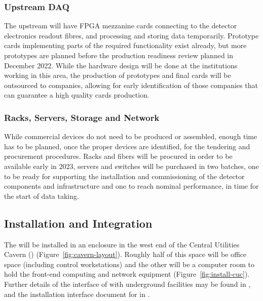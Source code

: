 \subsubsection{Upstream DAQ}
The upstream  will have FPGA mezzanine cards connecting to the detector electronics readout fibres, and processing and storing data temporarily. Prototype cards implementing parts of the required functionality exist already, but more prototypes are planned before the production readiness review planned in December 2022. While the hardware design will be done at the institutions working in this area, the production of prototypes and final cards will be outsourced to companies, allowing for early identification of those companies that can guarantee a high quality cards production.

\subsubsection{Racks, Servers, Storage and Network}
While commercial devices do not need to be produced or assembled, enough time has to be planned, once the proper devices are identified, for the tendering and procurement procedures. Racks and fibers will be procured in order to be available early in 2023, servers and switches will be purchased in two batches, one to be ready for supporting the installation and commissioning of the detector components and  infrastructure and one to reach nominal performance, in time for the start of data taking.

\subsection{Installation and Integration}


The  will be installed in an enclosure in the west end of the Central
Utilities Cavern () (Figure~\ref{fig:cavern-layout}).  Roughly
half of this space will be office space (including control
workstations) and the other will be a computer room to hold the 
front-end computing and network equipment (Figure~\ref{fig:install-cuc}). Further details of the interface of  with underground facilities
may be found in , and the installation interface document for  in .

